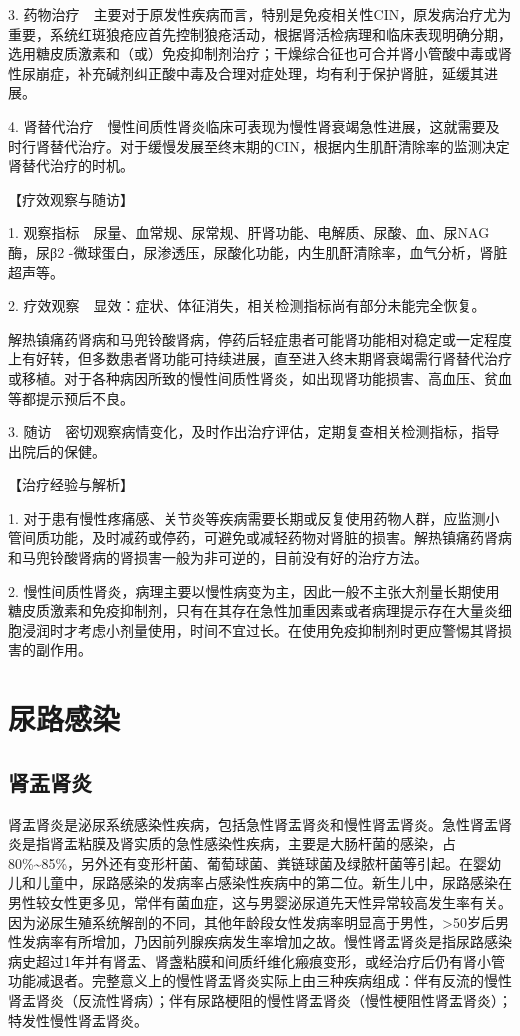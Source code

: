 3.
药物治疗　主要对于原发性疾病而言，特别是免疫相关性CIN，原发病治疗尤为重要，系统红斑狼疮应首先控制狼疮活动，根据肾活检病理和临床表现明确分期，选用糖皮质激素和（或）免疫抑制剂治疗；干燥综合征也可合并肾小管酸中毒或肾性尿崩症，补充碱剂纠正酸中毒及合理对症处理，均有利于保护肾脏，延缓其进展。

4.
肾替代治疗　慢性间质性肾炎临床可表现为慢性肾衰竭急性进展，这就需要及时行肾替代治疗。对于缓慢发展至终末期的CIN，根据内生肌酐清除率的监测决定肾替代治疗的时机。

【疗效观察与随访】

1.
观察指标　尿量、血常规、尿常规、肝肾功能、电解质、尿酸、血、尿NAG酶，尿β{2}
-微球蛋白，尿渗透压，尿酸化功能，内生肌酐清除率，血气分析，肾脏超声等。

2. 疗效观察　显效：症状、体征消失，相关检测指标尚有部分未能完全恢复。

解热镇痛药肾病和马兜铃酸肾病，停药后轻症患者可能肾功能相对稳定或一定程度上有好转，但多数患者肾功能可持续进展，直至进入终末期肾衰竭需行肾替代治疗或移植。对于各种病因所致的慢性间质性肾炎，如出现肾功能损害、高血压、贫血等都提示预后不良。

3.
随访　密切观察病情变化，及时作出治疗评估，定期复查相关检测指标，指导出院后的保健。

【治疗经验与解析】

1.
对于患有慢性疼痛感、关节炎等疾病需要长期或反复使用药物人群，应监测小管间质功能，及时减药或停药，可避免或减轻药物对肾脏的损害。解热镇痛药肾病和马兜铃酸肾病的肾损害一般为非可逆的，目前没有好的治疗方法。

2.
慢性间质性肾炎，病理主要以慢性病变为主，因此一般不主张大剂量长期使用糖皮质激素和免疫抑制剂，只有在其存在急性加重因素或者病理提示存在大量炎细胞浸润时才考虑小剂量使用，时间不宜过长。在使用免疫抑制剂时更应警惕其肾损害的副作用。

\section{尿路感染}

\subsection{肾盂肾炎}

肾盂肾炎是泌尿系统感染性疾病，包括急性肾盂肾炎和慢性肾盂肾炎。急性肾盂肾炎是指肾盂粘膜及肾实质的急性感染性疾病，主要是大肠杆菌的感染，占80\%\textasciitilde{}85\%，另外还有变形杆菌、葡萄球菌、粪链球菌及绿脓杆菌等引起。在婴幼儿和儿童中，尿路感染的发病率占感染性疾病中的第二位。新生儿中，尿路感染在男性较女性更多见，常伴有菌血症，这与男婴泌尿道先天性异常较高发生率有关。因为泌尿生殖系统解剖的不同，其他年龄段女性发病率明显高于男性，\textgreater{}50岁后男性发病率有所增加，乃因前列腺疾病发生率增加之故。慢性肾盂肾炎是指尿路感染病史超过1年并有肾盂、肾盏粘膜和间质纤维化瘢痕变形，或经治疗后仍有肾小管功能减退者。完整意义上的慢性肾盂肾炎实际上由三种疾病组成：伴有反流的慢性肾盂肾炎（反流性肾病）；伴有尿路梗阻的慢性肾盂肾炎（慢性梗阻性肾盂肾炎）；特发性慢性肾盂肾炎。

